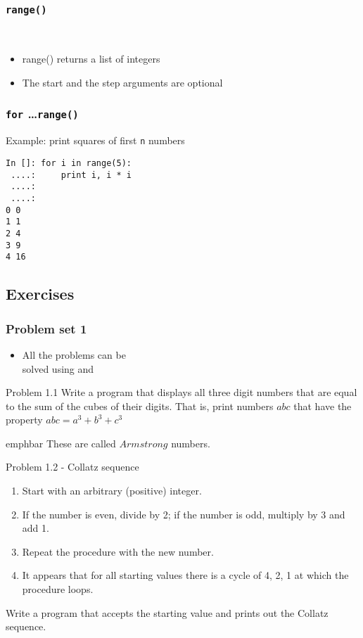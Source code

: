 \documentclass[14pt,compress]{beamer}
\newcommand{\emphbar}[1]
{\begin{beamercolorbox}[rounded=true]{emphbar} 
      {#1}
 \end{beamercolorbox}
}
\newcounter{time}
\newcommand{\inctime}[1]{\addtocounter{time}{#1}{\tiny \thetime\ m}}
\newcommand{\typ}[1]{\texttt{#1}}
\newcommand{\kwrd}[1]{ \texttt{\textbf{\color{blue}{#1}}}  }
\begin{document}
\begin{frame}[fragile]
\frametitle{\typ{range()}}
\kwrd{range([start,] stop[, step])}\\
\begin{itemize}
  \item \alert {range() returns a list of integers}
  \item \alert {The start and the step arguments are optional}  
\end{itemize}
\end{frame}

\begin{frame}[fragile]
  \frametitle{\typ{for} \ldots \typ{range()}}
Example: print squares of first \typ{n} numbers
  \begin{lstlisting}
In []: for i in range(5):
 ....:     print i, i * i
 ....:     
 ....:     
0 0
1 1
2 4
3 9
4 16
\end{lstlisting}
\inctime{5}
\end{frame}

\subsection{Exercises}
\begin{frame}
  \frametitle{Problem set 1}
  \begin{itemize}
    \item All the problems can be\\
      solved using \kwrd{if} and \kwrd{while} 
  \end{itemize}
\end{frame}

\begin{frame}{Problem 1.1}
  Write a program that displays all three digit numbers that are equal to the sum of the cubes of their digits. That is, print numbers $abc$ that have the property $abc = a^3 + b^3 + c^3$\\
\vspace*{0.2in}
\emphbar{These are called $Armstrong$ numbers.}
\end{frame}
  
\begin{frame}{Problem 1.2 - Collatz sequence}
\begin{enumerate}
  \item Start with an arbitrary (positive) integer. 
  \item If the number is even, divide by 2; if the number is odd, multiply by 3 and add 1.
  \item Repeat the procedure with the new number.
  \item It appears that for all starting values there is a cycle of 4, 2, 1 at which the procedure loops.
\end{enumerate}
    Write a program that accepts the starting value and prints out the Collatz sequence.
\end{frame}
\end{document}
